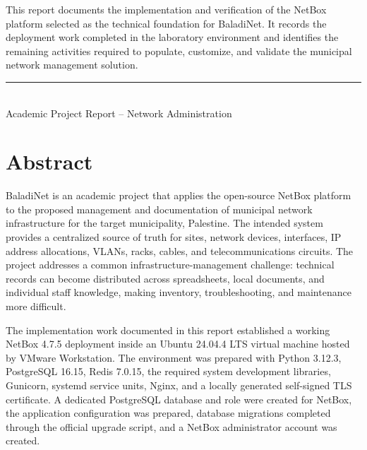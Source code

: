 \documentclass[11pt,a4paper,oneside]{report}
\begin{document}
\begin{titlepage}
\begin{center}
\vfill

\begin{minipage}{0.88\textwidth}
\centering
\normalsize
This report documents the implementation and verification of the NetBox platform selected as the technical foundation for BaladiNet. It records the deployment work completed in the laboratory environment and identifies the remaining activities required to populate, customize, and validate the municipal network management solution.
\end{minipage}

\vspace{0.55cm}
{\color{Teal}\rule{0.48\textwidth}{0.8pt}}\\[0.18cm]
{\small Academic Project Report -- Network Administration}
\end{center}
\end{titlepage}


\chapter*{Abstract}

BaladiNet is an academic project that applies the open-source NetBox platform to the proposed management and documentation of municipal network infrastructure for the target municipality, Palestine. The intended system provides a centralized source of truth for sites, network devices, interfaces, IP address allocations, VLANs, racks, cables, and telecommunications circuits. The project addresses a common infrastructure-management challenge: technical records can become distributed across spreadsheets, local documents, and individual staff knowledge, making inventory, troubleshooting, and maintenance more difficult.

The implementation work documented in this report established a working NetBox 4.7.5 deployment inside an Ubuntu 24.04.4 LTS virtual machine hosted by VMware Workstation. The environment was prepared with Python 3.12.3, PostgreSQL 16.15, Redis 7.0.15, the required system development libraries, Gunicorn, systemd service units, Nginx, and a locally generated self-signed TLS certificate. A dedicated PostgreSQL database and role were created for NetBox, the application configuration was prepared, database migrations completed through the official upgrade script, and a NetBox administrator account was created.
\end{document}
